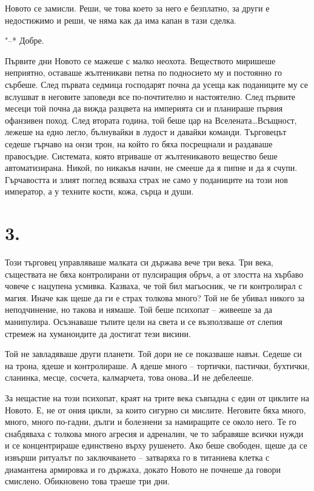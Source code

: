 \documentclass[ebook,openany,12pt]{memoir}
\begin{document}
Новото се замисли. Реши, че това което за него е безплатно, за други е недостижимо и реши, че няма как да има капан в тази сделка.

"--* Добре.

Първите дни Новото се мажеше с малко неохота. Веществото миришеше неприятно, оставаше жълтеникави петна по подносието му и постоянно го сърбеше. След първата седмица господарят почна да усеща как поданиците му се вслушват в неговите заповеди все по-почтително и настоятелно. След първите месеци той почна да вижда разцвета на империята си и планираше първия офанзивен поход. След втората година, той беше цар на Вселената\ldots Всъщност, лежеше на едно легло, бълнувайки в лудост и давайки команди. Търговецът седеше гърчаво на онзи трон, на който го бяха посрещнали и раздаваше правосъдие. Системата, която втриваше от жълтеникавото вещество беше автоматизирана. Никой, по никакъв начин, не смееше да я пипне и да я счупи. Гърчавостта и злият поглед всяваха страх не само у поданиците на този нов император, а у техните кости, кожа, сърца и души.

\section*{3.}

Този търговец управляваше малката си държава вече три века. Три века, съществата не бяха контролирани от пулсиращия обръч, а от злостта на хърбаво човече с нацупена усмивка. Казваха, че той бил магьосник, че ги контролирал с магия. Иначе как щеше да ги е страх толкова много? Той не бе убивал никого за неподчинение, но такова и нямаше. Той беше психопат – живееше за да манипулира. Осъзнаваше тъпите цели на света и се възползваше от слепия стремеж на хуманоидите да достигат тези висини.

Той не завладяваше други планети. Той дори не се показваше навън. Седеше си на трона, ядеше и контролираше. А ядеше много – тортички, пастички, бухтички, сланинка, месце, сосчета, калмарчета, това онова\ldots И не дебелееше.

За нещастие на този психопат, краят на трите века съвпадна с един от циклите на Новото. Е, не от ония цикли, за които сигурно си мислите. Неговите бяха много, много, много по-гадни, дълги и болезнени за намиращите се около него. Те го снабдяваха с толкова много агресия и адреналин, че то забравяше всички нужди и се концентрираше единствено върху рушенето. Ако беше свободен, щеше да се извърши ритуалът по заключването – затваряха го в титаниева клетка с диамантена армировка и го държаха, докато Новото не почнеше да говори смислено. Обикновено това траеше три дни.
\end{document}
